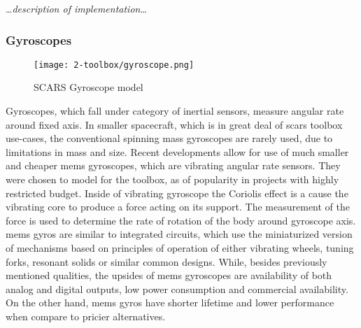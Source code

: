         \dots\textit{description of implementation}\dots

    \subsubsection{Gyroscopes}

        \begin{figure}[H]
            \centering
            \texttt{[image: 2-toolbox/gyroscope.png]}
            \caption{SCARS Gyroscope model}
            \label{fig:gryo_simulink}
        \end{figure}

        Gyroscopes, which fall under category of inertial sensors, measure angular rate around fixed axis. In smaller spacecraft, which is in great deal of \ac{scars} toolbox use-cases, the conventional spinning mass gyroscopes are rarely used, due to limitations in mass and size. Recent developments allow for use of much smaller and cheaper \ac{mems} gyroscopes, which are vibrating angular rate sensors. They were chosen to model for the toolbox, as of popularity in projects with highly restricted budget. \cite{armenise2010advances} Inside of vibrating gyroscope the Coriolis effect is a cause the vibrating core to produce a force acting on its support. The measurement of the force is used to determine the rate of rotation of the body around gyroscope axis. \ac{mems} gyros are similar to integrated circuits, which use the miniaturized version of mechanisms based on principles of operation of either vibrating wheels, tuning forks, resonant solids or similar common designs. \cite{bernstein2003overview} While, besides previously mentioned qualities, the upsides of \ac{mems} gyroscopes are availability of both analog and digital outputs, low power consumption and commercial availability. On the other hand, \ac{mems} gyros have shorter lifetime and lower performance when compare to pricier alternatives.

